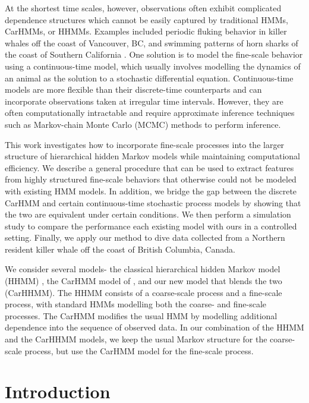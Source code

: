 At the shortest time scales, however, observations often exhibit complicated dependence structures which cannot be easily captured by traditional HMMs, CarHMMs, or HHMMs. Examples included periodic fluking behavior in killer whales off the coast of Vancouver, BC, and swimming patterns of horn sharks of the coast of Southern California \citep{Adam:2019}. One solution is to model the fine-scale behavior using a continuous-time model, which usually involves modelling the dynamics of an animal as the solution to a stochastic differential equation. Continuous-time models are more flexible than their discrete-time counterparts and can incorporate observations taken at irregular time intervals. However, they are often computationally intractable and require approximate inference techniques such as Markov-chain Monte Carlo (MCMC) methods to perform inference.

This work investigates how to incorporate fine-scale processes into the larger structure of hierarchical hidden Markov models while maintaining computational efficiency. We describe a general procedure that can be used to extract features from highly structured fine-scale behaviors that otherwise could not be modeled with existing HMM models. In addition, we bridge the gap between the discrete CarHMM and certain continuous-time stochastic process models by showing that the two are equivalent under certain conditions. We then perform a simulation study to compare the performance each existing model with ours in a controlled setting. Finally, we apply our method to dive data collected from a Northern resident killer whale off the coast of British Columbia, Canada.

We consider several models- the classical hierarchical hidden Markov model (HHMM) \citep{Barajas:2017}, the CarHMM model of \citep{Lawler:2019}, and our new model that blends the two (CarHHMM). The HHMM consists of a coarse-scale process and a fine-scale process, with standard HMMs modelling both the coarse- and fine-scale processes. The CarHMM  modifies the usual HMM by modelling additional dependence into the sequence of observed data. In our combination of the HHMM and the CarHHMM models, we keep the usual Markov structure for the coarse-scale process, but use the CarHMM model for the fine-scale process.



\iffalse

\section{Introduction}

